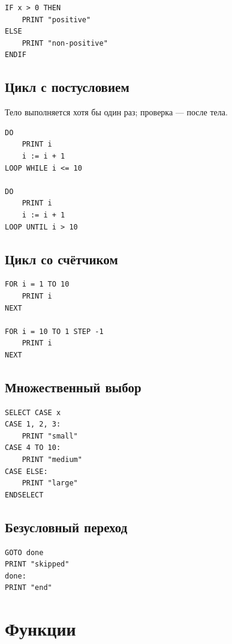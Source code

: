 \documentclass[14pt,a4paper]{article}
\begin{document}
\begin{lstlisting}[language={},numbers=none]
IF x > 0 THEN
    PRINT "positive"
ELSE
    PRINT "non-positive"
ENDIF
\end{lstlisting}

\subsection{Цикл с постусловием}

Тело выполняется хотя бы один раз; проверка — после тела.
\begin{lstlisting}[language={},numbers=none]
DO
    PRINT i
    i := i + 1
LOOP WHILE i <= 10

DO
    PRINT i
    i := i + 1
LOOP UNTIL i > 10
\end{lstlisting}

\subsection{Цикл со счётчиком}

\begin{lstlisting}[language={},numbers=none]
FOR i = 1 TO 10
    PRINT i
NEXT

FOR i = 10 TO 1 STEP -1
    PRINT i
NEXT
\end{lstlisting}

\subsection{Множественный выбор}

\begin{lstlisting}[language={},numbers=none]
SELECT CASE x
CASE 1, 2, 3:
    PRINT "small"
CASE 4 TO 10:
    PRINT "medium"
CASE ELSE:
    PRINT "large"
ENDSELECT
\end{lstlisting}

\subsection{Безусловный переход}

\begin{lstlisting}[language={},numbers=none]
GOTO done
PRINT "skipped"
done:
PRINT "end"
\end{lstlisting}

\section{Функции}
\end{document}
